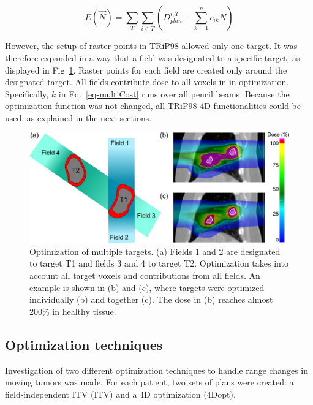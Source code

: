 \documentclass[type=dr, dr=rernat, accentcolor=tud7b,colorbacktitle, bigchapter, openright, twoside, 12pt ]{tudthesis}
\begin{document}
\begin{equation}
\label{eq-multiCost}
 E(\vec{N}) = \sum_{T} \sum_{i\in T} \left( D_{plan}^{i,T} -\sum_{k=1}^n c_{ik}N\right)
\end{equation}

However, the setup of raster points in TRiP98 allowed only one target. It was therefore expanded in a way that a field was designated to a specific target, as displayed in Fig~\ref{Fig:multiTargets}. 
Raster points for each field are created only around the designated target. All fields contribute dose to all voxels in in optimization. Specifically, $k$ in Eq.~\ref{eq-multiCost} runs over all pencil beams. 
Because the optimization function was not changed, 
all TRiP98 4D functionalities could be used, as explained in the next sections.




\newpage


\begin{figure}[H]
	\begin{center}
		\includegraphics[width=1\textwidth]{./Images/multiTarget.png}
		\caption{Optimization of multiple targets. (a) Fields 1 and 2 are designated to target T1 and fields 3 and 4 to target T2. 
		Optimization takes into account all target voxels and contributions from all fields. An example is shown in (b) and (c), where targets
		were optimized individually (b) and together (c). The dose in (b) reaches almost 200\% in healthy tissue.}
		\label{Fig:multiTargets}
	\end{center}
\end{figure}



\subsection{Optimization techniques}

Investigation of two different optimization techniques to handle range changes in moving tumors was made. For each patient, two sets of plans were created: a field-independent ITV (ITV) and a 4D optimization (4Dopt). 
\end{document}
